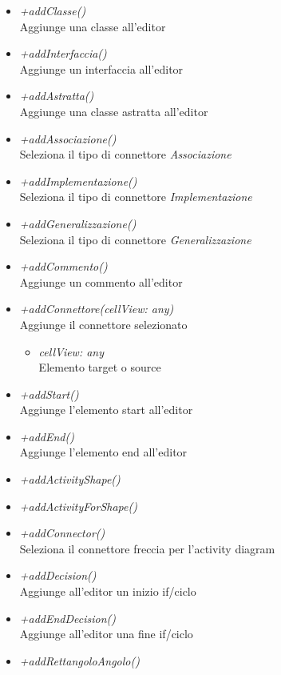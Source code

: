\begin{itemize}
\begin{itemize}
\begin{itemize}
    		\end{itemize}
    		\item \emph{+addClasse()}\\
    		Aggiunge una classe all'editor
    		\item \emph{+addInterfaccia()}\\
    		Aggiunge un interfaccia all'editor
    		\item \emph{+addAstratta()}\\
    		Aggiunge una classe astratta all'editor
    		\item \emph{+addAssociazione()}\\
    		Seleziona il tipo di connettore \textit{Associazione}
    		\item \emph{+addImplementazione()}\\
    		Seleziona il tipo di connettore \textit{Implementazione}
    		\item \emph{+addGeneralizzazione()}\\
    		Seleziona il tipo di connettore \textit{Generalizzazione}
    		\item \emph{+addCommento()}\\
    		Aggiunge un commento all'editor
    		\item \emph{+addConnettore(cellView: any)}\\
    		Aggiunge il connettore selezionato
    			\begin{itemize}
    			\item \emph{cellView: any}\\
    			Elemento target o source
    		\end{itemize}
    		\item \emph{+addStart()}\\
    		Aggiunge l'elemento start all'editor
    		\item \emph{+addEnd()}\\
    		Aggiunge l'elemento end all'editor
    		\item \emph{+addActivityShape()}\\
    		
    		\item \emph{+addActivityForShape()}\\
    		
    		\item \emph{+addConnector()}\\
    		Seleziona il connettore freccia per l'activity diagram
    		\item \emph{+addDecision()}\\
    		Aggiunge all'editor un inizio if/ciclo
    		\item \emph{+addEndDecision()}\\
    		Aggiunge all'editor una fine if/ciclo
    		\item \emph{+addRettangoloAngolo()}\\
    		
		\end{itemize}
\end{itemize}
